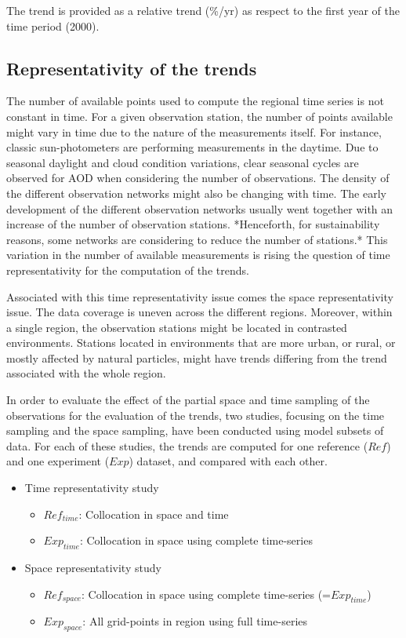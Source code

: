 \documentclass[journal abbreviation, manuscript]{copernicus}
\begin{document}
The trend is provided as a relative trend (\%/yr) as respect to the first year of the time period (2000).

\subsection{Representativity of the trends}
The number of available points used to compute the regional time series is not constant in time. For a given observation station, the number of points available might vary in time due to the nature of the measurements itself. For instance, classic sun-photometers are performing measurements in the daytime. Due to seasonal daylight and cloud condition variations, clear seasonal cycles are observed for AOD when considering the number of observations. The density of the different observation networks might also be changing with time. The early development of the different observation networks usually went together with an increase of the number of observation stations. *Henceforth, for sustainability reasons, some networks are considering to reduce the number of stations.* This variation in the number of available measurements is rising the question of time representativity for the computation of the trends.

Associated with this time representativity issue comes the space representativity issue. The data coverage is uneven across the different regions. Moreover, within a single region, the observation stations might be located in contrasted environments. Stations located in environments that are more urban, or rural, or mostly affected by natural particles, might have trends differing from the trend associated with the whole region.

In order to evaluate the effect of the partial space and time sampling of the observations for the evaluation of the trends, two studies, focusing on the time sampling and the space sampling, have been conducted using model subsets of data. For each of these studies, the trends are computed for one reference ($Ref$) and one experiment ($Exp$) dataset, and compared with each other.
\begin{itemize}
 \item Time representativity study
       \begin{itemize}
        \item $Ref_{time}$: Collocation in space and time
        \item $Exp_{time}$: Collocation in space using complete time-series
       \end{itemize}
 \item Space representativity study
       \begin{itemize}
        \item $Ref_{space}$: Collocation in space using complete time-series (=$Exp_{time}$)
        \item $Exp_{space}$: All grid-points in region using full time-series
       \end{itemize}
\end{itemize}
\end{document}
